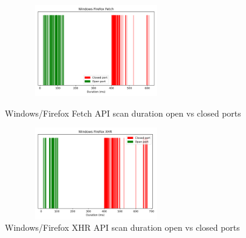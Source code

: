 \begin{figure}[ht]
\centering
\begin{minipage}{.45\textwidth}
  \centering
\includegraphics[width=8cm, height=4cm, keepaspectratio]{port_scanning_techniques/img/windows_Firefox_efficacy_fetch.png}
    \caption{Windows/Firefox Fetch API scan duration open vs closed ports}
    \label{fig:win-firefox-fetch}
\end{minipage}
\hspace{0.5cm} %
\begin{minipage}{.45\textwidth}
\includegraphics[width=8cm, height=4cm, keepaspectratio]{port_scanning_techniques/img/windows_Firefox_efficacy_xhr.png}
    \caption{Windows/Firefox XHR API scan duration open vs closed ports}
    \label{fig:appendix-win-firefox-xhr}
\end{minipage}
\end{figure}


